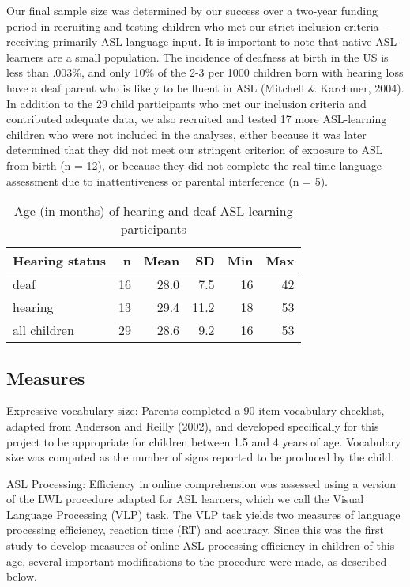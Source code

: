 \documentclass[oneside]{report}
\begin{document}
Our final sample size was determined by our success over a two-year
funding period in recruiting and testing children who met our strict
inclusion criteria -- receiving primarily ASL language input. It is
important to note that native ASL-learners are a small population. The
incidence of deafness at birth in the US is less than .003\%, and only
10\% of the 2-3 per 1000 children born with hearing loss have a deaf
parent who is likely to be fluent in ASL (Mitchell \& Karchmer, 2004).
In addition to the 29 child participants who met our inclusion criteria
and contributed adequate data, we also recruited and tested 17 more
ASL-learning children who were not included in the analyses, either
because it was later determined that they did not meet our stringent
criterion of exposure to ASL from birth (n = 12), or because they did
not complete the real-time language assessment due to inattentiveness or
parental interference (n = 5).

\begingroup\fontsize{12}{14}\selectfont
\begin{longtable}[t]{lrrrrr}
\caption[Age of ASL-learning children]{\label{tab:sol-demo-table}Age (in months) of hearing and deaf ASL-learning participants}\\
\toprule
\textbf{Hearing status} & \textbf{n} & \textbf{Mean} & \textbf{SD} & \textbf{Min} & \textbf{Max}\\
\midrule
deaf & 16 & 28.0 & 7.5 & 16 & 42\\
hearing & 13 & 29.4 & 11.2 & 18 & 53\\
\hline
all children & 29 & 28.6 & 9.2 & 16 & 53\\
\bottomrule
\end{longtable}
\endgroup{}

\subsection{Measures}\label{measures}

Expressive vocabulary size: Parents completed a 90-item vocabulary
checklist, adapted from Anderson and Reilly (2002), and developed
specifically for this project to be appropriate for children between 1.5
and 4 years of age. Vocabulary size was computed as the number of signs
reported to be produced by the child.

ASL Processing: Efficiency in online comprehension was assessed using a
version of the LWL procedure adapted for ASL learners, which we call the
Visual Language Processing (VLP) task. The VLP task yields two measures
of language processing efficiency, reaction time (RT) and accuracy.
Since this was the first study to develop measures of online ASL
processing efficiency in children of this age, several important
modifications to the procedure were made, as described below.
\end{document}
